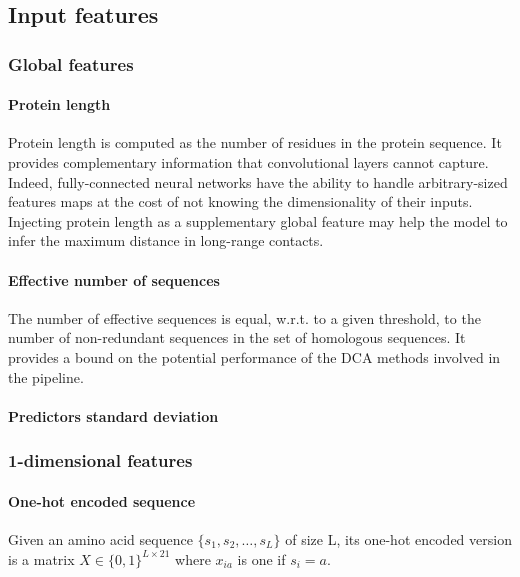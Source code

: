 \subsection{Input features} \label{inputfeatures}

    \subsubsection{Global features}

        \paragraph{Protein length}
	
  	    Protein length is computed as the number of residues in the protein sequence.
	    It provides complementary information that convolutional layers cannot capture.
 	    Indeed, fully-connected neural networks have the ability to handle arbitrary-sized
	    features maps at the cost of not knowing the dimensionality of their inputs.
	    Injecting protein length as a supplementary global feature may help the model
	    to infer the maximum distance in long-range contacts.

	\paragraph{Effective number of sequences}

	    The number of effective sequences is equal, w.r.t. to a given threshold,
	    to the number of non-redundant sequences in the set of homologous sequences.
	    It provides a bound on the potential performance of the DCA methods involved
	    in the pipeline.

        \paragraph{Predictors standard deviation}

    \subsubsection{1-dimensional features}

        \paragraph{One-hot encoded sequence}

            Given an amino acid sequence $\{s_1, s_2, \ldots,
            s_L\}$ of size L, its one-hot encoded version
            is a matrix $X \in \{0, 1\}^{L \times 21}$
            where $x_{ia}$ is one if $s_i = a$.

